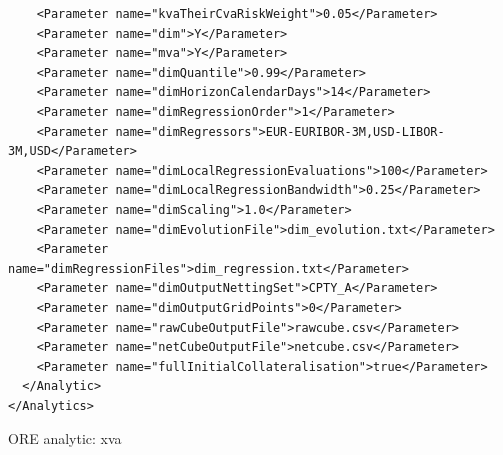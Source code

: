 \documentclass[12pt, a4paper]{article}
\begin{document}
{\begin{listing}[H]
\begin{verbatim}
    <Parameter name="kvaTheirCvaRiskWeight">0.05</Parameter>
    <Parameter name="dim">Y</Parameter>
    <Parameter name="mva">Y</Parameter>
    <Parameter name="dimQuantile">0.99</Parameter>
    <Parameter name="dimHorizonCalendarDays">14</Parameter>
    <Parameter name="dimRegressionOrder">1</Parameter>
    <Parameter name="dimRegressors">EUR-EURIBOR-3M,USD-LIBOR-3M,USD</Parameter>
    <Parameter name="dimLocalRegressionEvaluations">100</Parameter>
    <Parameter name="dimLocalRegressionBandwidth">0.25</Parameter>
    <Parameter name="dimScaling">1.0</Parameter>
    <Parameter name="dimEvolutionFile">dim_evolution.txt</Parameter>
    <Parameter name="dimRegressionFiles">dim_regression.txt</Parameter>
    <Parameter name="dimOutputNettingSet">CPTY_A</Parameter>      
    <Parameter name="dimOutputGridPoints">0</Parameter>
    <Parameter name="rawCubeOutputFile">rawcube.csv</Parameter>
    <Parameter name="netCubeOutputFile">netcube.csv</Parameter>
    <Parameter name="fullInitialCollateralisation">true</Parameter>
  </Analytic>
</Analytics>
\end{verbatim}
\caption{ORE analytic: xva}
\label{lst:ore_xva}
\end{listing}

}
\end{document}
